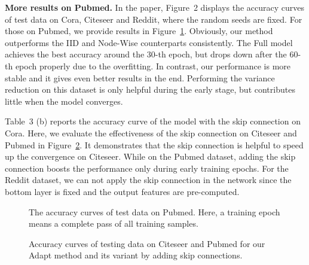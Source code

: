 \documentclass{article}
\begin{document}
\textbf{More results on Pubmed.}  In the paper, Figure~2 displays the accuracy curves of test data on Cora, Citeseer and Reddit, where the random seeds are fixed. For those on Pubmed, we provide results in Figure~\ref{Fig:sampling}. Obviously, our method outperforms the IID and Node-Wise counterparts consistently. The Full model achieves the best accuracy around the 30-th epoch, but drops down after the 60-th epoch properly due to the overfitting. In contrast, our performance is more stable and it gives even better results in the end. Performing the variance reduction on this dataset is only helpful during the early stage, but contributes little when the model converges.

Table~3 (b) reports the accuracy curve of the model with the skip connection on Cora. Here, we evaluate the effectiveness of the skip connection on Citeseer and Pubmed in Figure~\ref{Fig:sc}.
It demonstrates that the skip connection is helpful to speed up the convergence on Citeseer. While on the Pubmed dataset, adding the skip connection boosts the performance only during early training epochs.
For the Reddit dataset, we can not apply the skip connection in the network since the bottom layer is fixed and the output features are pre-computed.



\begin{figure}[!h]
\begin{center}
\caption{The accuracy curves of test data on Pubmed. Here, a training epoch means a complete pass of all training samples.}
\label{Fig:sampling}
\end{center}
\end{figure}


\begin{figure}[!h]
\begin{center}
\caption{Accuracy curves of testing data on Citeseer and Pubmed for our Adapt method and its variant by adding skip connections.}
\label{Fig:sc}
\end{center}
\end{figure}
\end{document}
